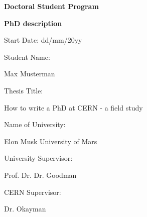 \documentclass{article}
\newcommand{\StudentName}{Max Musterman}
\newcommand{\UniSupervisorName}{Prof. Dr. Dr. Goodman}
\newcommand{\CernSupervisorName}{Dr. Okayman}
\begin{document}

\begin{center}
\vspace*{3\baselineskip}

{\huge \textbf{Doctoral Student Program}}

\vspace*{3\baselineskip}

{\LARGE \textbf{PhD description}}

\begin{large}
\vspace*{2\baselineskip}

Start Date: dd/mm/20yy

\vspace*{2\baselineskip}

Student Name:

\vspace*{\baselineskip}

\StudentName

\vspace*{2\baselineskip}

Thesis Title:

\vspace*{\baselineskip}

How to write a PhD at CERN - a field study

\vspace*{5\baselineskip}

Name of University:

\vspace*{\baselineskip}

Elon Musk University of Mars

\vspace*{2\baselineskip}

University Supervisor:

\vspace*{\baselineskip}

\UniSupervisorName

\vspace*{2\baselineskip}

CERN Supervisor:

\vspace*{\baselineskip}

\CernSupervisorName

\end{large}
\end{center}
\pagebreak
\end{document}
